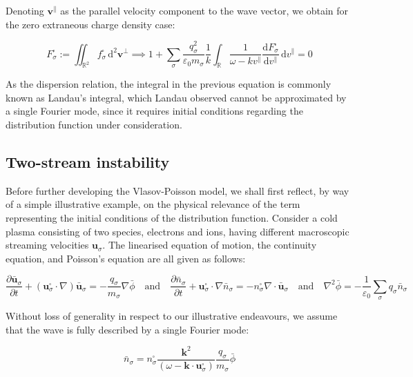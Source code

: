 Denoting $\mathbf{v}^\parallel$ as the parallel velocity component to the wave vector, we obtain for the zero extraneous charge density case:

\begin{equation}
    F_\sigma^\square:=\iint_{\mathbb{R}^2}f_\sigma^\square\,\mathrm{d}^2\mathbf{v}^\perp\implies1+\sum_\sigma\frac{q_\sigma^2}{\varepsilon_0 m_\sigma}\frac{1}{k}\int_{\mathbb{R}}\frac{1}{\omega-kv^\parallel}\frac{\mathrm{d}F_\sigma^\square}{\mathrm{d}v^\parallel}\,\mathrm{d}v^\parallel=0
\end{equation}

As the dispersion relation, the integral in the previous equation is commonly known as Landau's integral, which Landau observed cannot be approximated by a single Fourier mode, since it requires initial conditions regarding the distribution function under consideration.

\subsection{Two-stream instability}

\label{instability}

Before further developing the Vlasov-Poisson model, we shall first reflect, by way of a simple illustrative example, on the physical relevance of the term representing the initial conditions of the distribution function. Consider a cold plasma consisting of two species, electrons and ions, having different macroscopic streaming velocities $\mathbf{u}_\sigma$. The linearised equation of motion, the continuity equation, and Poisson's equation are all given as follows:

\begin{equation}
    \frac{\partial\bar{\mathbf{u}}_\sigma}{\partial t}+(\mathbf{u}_\sigma^\square\cdot\nabla)\bar{\mathbf{u}}_\sigma=-\frac{q_\sigma}{m_\sigma}\nabla\bar{\phi}\quad\text{and}\quad\frac{\partial\bar{n}_\sigma}{\partial t}+\mathbf{u}_\sigma^\square\cdot\nabla\bar{n}_\sigma=-n_\sigma^\square\nabla\cdot\bar{\mathbf{u}}_\sigma\quad\text{and}\quad\nabla^2\bar{\phi}=-\frac{1}{\varepsilon_0}\sum_{\sigma}q_\sigma\bar{n}_\sigma
\end{equation}

Without loss of generality in respect to our illustrative endeavours, we assume that the wave is fully described by a single Fourier mode:

\begin{equation}
    \bar{n}_\sigma=n_\sigma^\square\frac{\mathbf{k}^2}{(\omega-\mathbf{k}\cdot\mathbf{u}_\sigma^\square)}\frac{q_\sigma}{m_\sigma}\bar{\phi}
\end{equation}

